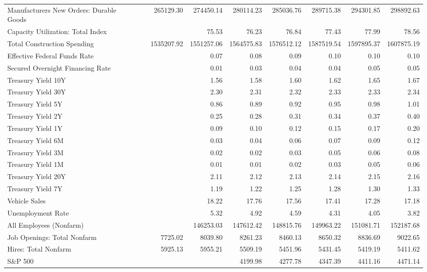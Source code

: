 \documentclass[11pt, letterpaper]{article}\usepackage[]{graphicx}\usepackage[]{color}
\begin{document}
\begin{table}[H]
\begin{tabular}{lrrrrrrrr}
  Manufacturers New Orders: Durable Goods &  & 265129.30 & 274450.14 & 280114.23 & 285036.76 & 289715.38 & 294301.85 & 298892.63 \\ 
  Capacity Utilization: Total Index &  &  & 75.53 & 76.23 & 76.84 & 77.43 & 77.99 & 78.56 \\ 
  Total Construction Spending &  & 1535207.92 & 1551257.06 & 1564575.83 & 1576512.12 & 1587519.54 & 1597895.37 & 1607875.19 \\ 
  Effective Federal Funds Rate &  &  & 0.07 & 0.08 & 0.09 & 0.10 & 0.10 & 0.10 \\ 
  Secured Overnight Financing Rate &  &  & 0.01 & 0.03 & 0.04 & 0.04 & 0.05 & 0.05 \\ 
  Treasury Yield 10Y &  &  & 1.56 & 1.58 & 1.60 & 1.62 & 1.65 & 1.67 \\ 
  Treasury Yield 30Y &  &  & 2.30 & 2.31 & 2.32 & 2.33 & 2.33 & 2.34 \\ 
  Treasury Yield 5Y &  &  & 0.86 & 0.89 & 0.92 & 0.95 & 0.98 & 1.01 \\ 
  Treasury Yield 2Y &  &  & 0.25 & 0.28 & 0.31 & 0.34 & 0.37 & 0.40 \\ 
  Treasury Yield 1Y &  &  & 0.09 & 0.10 & 0.12 & 0.15 & 0.17 & 0.20 \\ 
  Treasury Yield 6M &  &  & 0.03 & 0.04 & 0.06 & 0.07 & 0.09 & 0.12 \\ 
  Treasury Yield 3M &  &  & 0.02 & 0.02 & 0.03 & 0.05 & 0.06 & 0.08 \\ 
  Treasury Yield 1M &  &  & 0.01 & 0.01 & 0.02 & 0.03 & 0.05 & 0.06 \\ 
  Treasury Yield 20Y &  &  & 2.11 & 2.12 & 2.13 & 2.14 & 2.15 & 2.16 \\ 
  Treasury Yield 7Y &  &  & 1.19 & 1.22 & 1.25 & 1.28 & 1.30 & 1.33 \\ 
  Vehicle Sales &  &  & 18.22 & 17.76 & 17.56 & 17.41 & 17.28 & 17.18 \\ 
  Unemployment Rate &  &  & 5.32 & 4.92 & 4.59 & 4.31 & 4.05 & 3.82 \\ 
  All Employees (Nonfarm) &  &  & 146253.03 & 147612.42 & 148815.76 & 149963.22 & 151081.71 & 152187.68 \\ 
  Job Openings: Total Nonfarm &  & 7725.02 & 8039.80 & 8261.23 & 8460.13 & 8650.32 & 8836.69 & 9022.65 \\ 
  Hires: Total Nonfarm &  & 5925.13 & 5955.21 & 5509.19 & 5451.96 & 5431.45 & 5419.19 & 5411.62 \\ 
  S\&P 500 &  &  &  & 4199.98 & 4277.78 & 4347.39 & 4411.16 & 4471.14 \\ 

\end{tabular}
\end{table}
\end{document}
